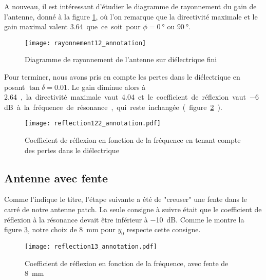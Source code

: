 A nouveau, il est intéressant d'étudier le diagramme de rayonnement du gain de l'antenne, donné à la figure \ref{fig:rayonnement12_annotation}, où l'on remarque que la directivité maximale et le gain maximal valent \SI{3.64} que ce soit pour $\phi = \SI{0}{\degree}$ ou $\SI{90}{\degree}$.
\begin{figure}
\centering
\texttt{[image: rayonnement12\_annotation]}
\caption{Diagramme de rayonnement de l'antenne sur diélectrique fini}
\label{fig:rayonnement12_annotation}
\end{figure}
Pour terminer, nous avons pris en compte les pertes dans le diélectrique en posant $\tan{\delta} = 0.01$. Le gain diminue alors à \SI{2.64}, la directivité maximale vaut \SI{4.04} et le coefficient de réflexion vaut \SI{-6}{\deci\bel} à la fréquence de résonance, qui reste inchangée (figure \ref{fig:reflection122_annotation}).
\begin{figure}[htbp]
\centering
\texttt{[image: reflection122\_annotation.pdf]}
\caption{Coefficient de réflexion en fonction de la fréquence en tenant compte des pertes dans le diélectrique}
\label{fig:reflection122_annotation}
\end{figure}


\subsection{Antenne avec fente}
Comme l'indique le titre, l'étape suivante a été de "creuser" une fente dans le carré de notre antenne patch. La seule consigne à suivre était que le coefficient de réflexion à la résonance devait être inférieur à \SI{-10}{\deci\bel}. Comme le montre la figure \ref{fig:reflection13_annotation}, notre choix de \SI{8}{\milli\meter} pour $y_0$ respecte cette consigne.
\begin{figure}[htbp]
\centering
\texttt{[image: reflection13\_annotation.pdf]}
\caption{Coefficient de réflexion en fonction de la fréquence, avec fente de \SI{8}{\milli\meter}}
\label{fig:reflection13_annotation}
\end{figure}

